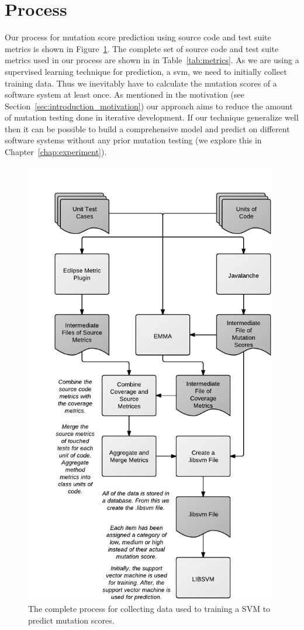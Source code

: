 \section{Process}
\label{sec:approach_process}
Our process for mutation score prediction using source code and test suite metrics is shown in Figure~\ref{fig:process}. The complete set of source code and test suite metrics used in our process are shown in in Table~\ref{tab:metrics}. As we are using a supervised learning technique for prediction, a \gls{svm}, we need to initially collect training data. Thus we inevitably have to calculate the mutation scores of a software system at least once. As mentioned in the motivation (see Section~\ref{sec:introduction_motivation}) our approach aims to reduce the amount of mutation testing done in iterative development. If our technique generalize well then it can be possible to build a comprehensive model and predict on different software systems without any prior mutation testing (we explore this in Chapter~\ref{chap:experiment}).

\begin{figure}[h]
  \centering
  \includegraphics[width=11cm]{figures/process.pdf}
  \caption{The complete process for collecting data used to training a SVM to predict mutation scores.}
  \label{fig:process}
\end{figure}

